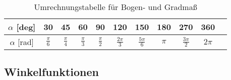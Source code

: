 \begin{table}[htp]
    \centering
    \caption{Umrechnungstabelle für Bogen- und Gradmaß}
    \begin{tabular}{c c c c c c c c c c c}
        \toprule 
        $\alpha$ [deg] & 30 & 45 & 60 & 90 & 120 & 150 & 180 & 270 & 360 \\
        \midrule
        $\alpha$ [rad] & $\frac{\pi}{6}$ & $\frac{\pi}{4}$ & $\frac{\pi}{3}$ & $\frac{\pi}{2}$ & $\frac{2\pi}{3}$ & $\frac{5\pi}{6}$ & $\pi$ & $\frac{3\pi}{2}$ & $2\pi$ 
    \end{tabular}
\end{table}

\subsection{Winkelfunktionen}

